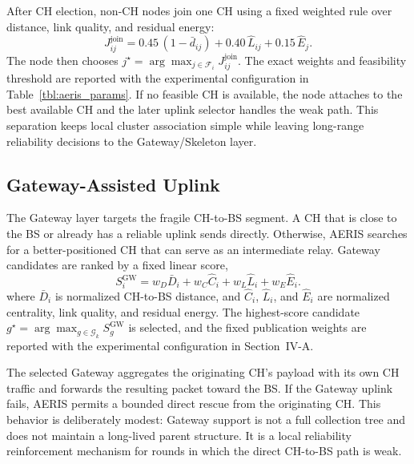\documentclass[conference]{IEEEtran}
\begin{document}
After CH election, non-CH nodes join one CH using a fixed weighted rule over distance, link quality, and residual energy:
\begin{equation}
J_{ij}^{\mathrm{join}}=0.45\,(1-\bar{d}_{ij})+0.40\,\hat{L}_{ij}+0.15\,\hat{E}_j .
\end{equation}
The node then chooses $j^\star=\arg\max_{j\in\mathcal{F}_i}J_{ij}^{\mathrm{join}}$. The exact weights and feasibility threshold are reported with the experimental configuration in Table~\ref{tbl:aeris_params}. If no feasible CH is available, the node attaches to the best available CH and the later uplink selector handles the weak path. This separation keeps local cluster association simple while leaving long-range reliability decisions to the Gateway/Skeleton layer.

\subsection{Gateway-Assisted Uplink}
The Gateway layer targets the fragile CH-to-BS segment. A CH that is close to the BS or already has a reliable uplink sends directly. Otherwise, AERIS searches for a better-positioned CH that can serve as an intermediate relay. Gateway candidates are ranked by a fixed linear score,
\begin{equation}
S_i^{\mathrm{GW}}=w_D\bar{D}_i+w_C\hat{C}_i+w_L\hat{L}_i+w_E\hat{E}_i .
\end{equation}
where $\bar{D}_i$ is normalized CH-to-BS distance, and $\hat{C}_i$, $\hat{L}_i$, and $\hat{E}_i$ are normalized centrality, link quality, and residual energy. The highest-score candidate $g^\star=\arg\max_{g\in\mathcal{G}_k}S_g^{\mathrm{GW}}$ is selected, and the fixed publication weights are reported with the experimental configuration in Section~IV-A.

The selected Gateway aggregates the originating CH's payload with its own CH traffic and forwards the resulting packet toward the BS. If the Gateway uplink fails, AERIS permits a bounded direct rescue from the originating CH. This behavior is deliberately modest: Gateway support is not a full collection tree and does not maintain a long-lived parent structure. It is a local reliability reinforcement mechanism for rounds in which the direct CH-to-BS path is weak.
\end{document}

